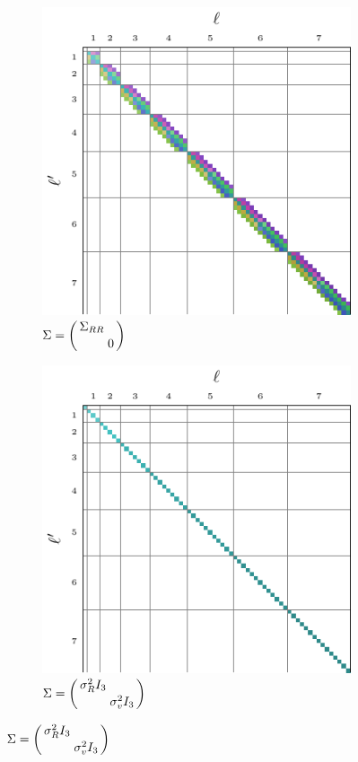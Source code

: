 \documentclass[../../main.tex]{subfiles}
\begin{document}
\begin{refsection}
\begin{figure}
		\bigskip
		\begin{subfigure}[b]{0.31\textwidth}
			\centering
			\caption{$\Sigma = \smqty(\dmat{\Sigma_{RR}, 0})$}
			\includegraphics[width=\textwidth]{Bmat_se3_rot.pdf}
		\end{subfigure}
		\begin{subfigure}[b]{0.31\textwidth}
			\centering
			\caption{$\Sigma = \smqty(\dmat{\sigma_R^2 I_3, \sigma_v^2 I_3})$}
			\includegraphics[width=\textwidth]{Bmat_se3_scalarindep.pdf}

\end{subfigure}
\end{figure}
\end{refsection}
\end{document}
